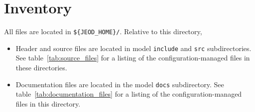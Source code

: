 \section{Inventory}
All \MODELTITLEx files are located in {\tt \$\{JEOD\_HOME\}/\MODELPATH}.
Relative to this directory,
\begin{itemize}
\vspace{-0.2\baselineskip}
%
\item Header and source files are located
in model {\tt include} and {\tt src} subdirectories.
See table~\ref{tab:source_files}
for a listing of the configuration-managed files in these directories.
%
%
%
%
\vspace{-0.1\baselineskip}
\item Documentation files are located in the model {\tt docs} subdirectory.
See table~\ref{tab:documentation_files}
for a listing of the configuration-managed files in this directory.
%
%
%
\end{itemize}



